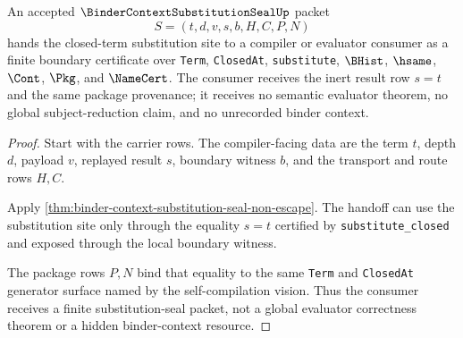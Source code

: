 \begin{theorem}
\label{thm:binder-context-substitution-seal-compiler-handoff}
An accepted $\BinderContextSubstitutionSealUp$ packet
$$
S=(t,d,v,s,b,H,C,P,N)
$$
hands the closed-term substitution site to a compiler or evaluator consumer as a finite boundary certificate over \texttt{Term}, \texttt{ClosedAt}, \texttt{substitute}, $\BHist$, $\hsame$, $\Cont$, $\Pkg$, and $\NameCert$. The consumer receives the inert result row $s=t$ and the same package provenance; it receives no semantic evaluator theorem, no global subject-reduction claim, and no unrecorded binder context.
\end{theorem}
\begin{proof}
Start with the carrier rows. The compiler-facing data are the term $t$, depth $d$, payload $v$, replayed result $s$, boundary witness $b$, and the transport and route rows $H,C$.

Apply \autoref{thm:binder-context-substitution-seal-non-escape}. The handoff can use the substitution site only through the equality $s=t$ certified by \texttt{substitute\_closed} and exposed through the local boundary witness.

The package rows $P,N$ bind that equality to the same \texttt{Term} and \texttt{ClosedAt} generator surface named by the self-compilation vision. Thus the consumer receives a finite substitution-seal packet, not a global evaluator correctness theorem or a hidden binder-context resource.
\end{proof}

